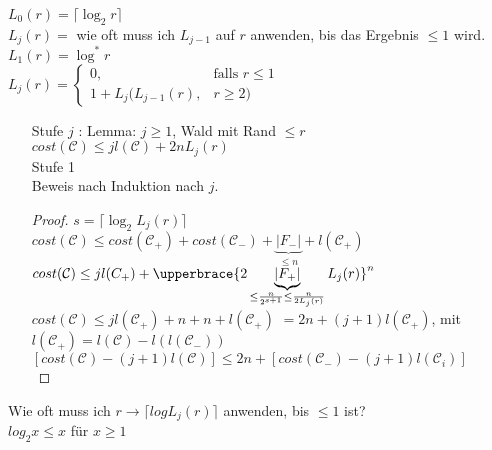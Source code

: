 $L_0(r) = \lceil \log_2 r \rceil$\\
$L_j(r) = $ wie oft muss ich $L_{j-1}$ auf $r$ anwenden, bis das Ergebnis $\leq 1$ wird.\\
$L_1(r) = \log^* r$\\
$L_j(r) = \begin{cases} 0, &\text{falls } r \leq 1 \\ 1 + L_j(L_{j-1}(r), &r \geq 2) \end{cases}$
\begin{enumerate}
\item[Stufe $j$]: Lemma: $j \geq 1$, Wald mit Rand $\leq r$\\
$cost(\mathcal{C}) \leq j l (\mathcal{C}) + 2n L_j(r)$\\
Stufe 1 \checkmark \\
Beweis nach Induktion nach $j$.
\begin{proof}
$s = \lceil \log_2 L_j(r) \rceil$\\
$cost(\mathcal{C}) \leq cost(\mathcal{C}_+) + cost(\mathcal{C}_-) + \underbrace{ |F_-|}_{\leq n} + l(\mathcal{C_+})$
$cost(\mathcal{C}) \leq j l (C_+) + \upperbrace{2 \underbrace{ |F_+| }_{ \leq \frac{n}{2^{s+1}} \leq \frac{n}{2L_j(r)}} L_j(r)}^n$
$cost(\mathcal{C}) \leq j l(\mathcal{C}_+) + n +n + l(\mathcal{C_+})$
$=2n + (j+1) l(\mathcal{C}_+)$, mit $ l(\mathcal{C}_+) = l (\mathcal{C}) - l ( l(\mathcal{C}_-))$\\
$[cost(\mathcal{C})-(j+1)l(\mathcal{C})] \leq 2n + [cost(\mathcal{C}_-)-(j+1)l(\mathcal{C}_i)]$\\
\end{proof}
\end{enumerate}
Wie oft muss ich $r \rightarrow \lceil log L_j(r) \rceil$ anwenden, bis $\leq 1$ ist?\\
$log_2 x \leq x$ für $x \geq 1$\\